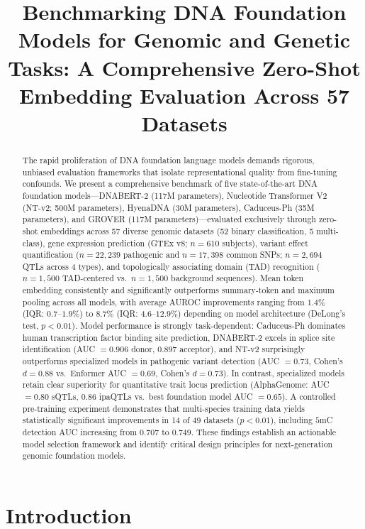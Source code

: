 \documentclass[11pt]{article}
\title{Benchmarking DNA Foundation Models for Genomic and Genetic Tasks: A Comprehensive Zero-Shot Embedding Evaluation Across 57 Datasets}
\date{}
\begin{document}
\maketitle

\begin{abstract}
The rapid proliferation of DNA foundation language models demands rigorous, unbiased evaluation frameworks that isolate representational quality from fine-tuning confounds. We present a comprehensive benchmark of five state-of-the-art DNA foundation models---DNABERT-2 (117M parameters), Nucleotide Transformer V2 (NT-v2; 500M parameters), HyenaDNA (30M parameters), Caduceus-Ph (35M parameters), and GROVER (117M parameters)---evaluated exclusively through zero-shot embeddings across 57 diverse genomic datasets (52 binary classification, 5 multi-class), gene expression prediction (GTEx v8; $n = 610$ subjects), variant effect quantification ($n = 22{,}239$ pathogenic and $n = 17{,}398$ common SNPs; $n = 2{,}694$ QTLs across 4 types), and topologically associating domain (TAD) recognition ($n = 1{,}500$ TAD-centered vs.\ $n = 1{,}500$ background sequences). Mean token embedding consistently and significantly outperforms summary-token and maximum pooling across all models, with average AUROC improvements ranging from $1.4\%$ (IQR: $0.7$--$1.9\%$) to $8.7\%$ (IQR: $4.6$--$12.9\%$) depending on model architecture (DeLong's test, $p < 0.01$). Model performance is strongly task-dependent: Caduceus-Ph dominates human transcription factor binding site prediction, DNABERT-2 excels in splice site identification (AUC $= 0.906$ donor, $0.897$ acceptor), and NT-v2 surprisingly outperforms specialized models in pathogenic variant detection (AUC $= 0.73$, Cohen's $d = 0.88$ vs.\ Enformer AUC $= 0.69$, Cohen's $d = 0.73$). In contrast, specialized models retain clear superiority for quantitative trait locus prediction (AlphaGenome: AUC $= 0.80$ sQTLs, $0.86$ ipaQTLs vs.\ best foundation model AUC $= 0.65$). A controlled pre-training experiment demonstrates that multi-species training data yields statistically significant improvements in 14 of 49 datasets ($p < 0.01$), including $5$mC detection AUC increasing from $0.707$ to $0.749$. These findings establish an actionable model selection framework and identify critical design principles for next-generation genomic foundation models.
\end{abstract}

\section{Introduction}
\end{document}
